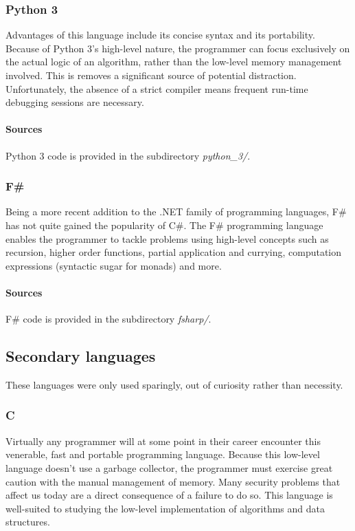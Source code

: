 \documentclass{article}
\begin{document}
\subsubsection{Python 3}
Advantages of this language include its concise syntax and its portability.
Because of Python 3's high-level nature, the programmer can focus exclusively on the actual logic of an algorithm,
rather than the low-level memory management involved. This is removes a significant source of potential distraction.
Unfortunately, the absence of a strict compiler means frequent run-time debugging sessions are necessary.

\paragraph{Sources}
Python 3 code is provided in the subdirectory {\em python\_3/}.

\subsubsection{F\#}
Being a more recent addition to the .NET family of programming languages,
F\# has not quite gained the popularity of C\#.
The F\# programming language enables the programmer to tackle problems
using high-level concepts such as recursion, higher order functions,
partial application and currying, computation expressions
(syntactic sugar for monads) and more.

\paragraph{Sources}
F\# code is provided in the subdirectory {\em fsharp/}.


\newpage


\subsection{Secondary languages}
These languages were only used sparingly, out of curiosity rather than necessity.

\subsubsection{C}
Virtually any programmer will at some point in their career encounter this venerable,
fast and portable programming language. Because this low-level language doesn't use a garbage collector,
the programmer must exercise great caution with the manual management of memory.
Many security problems that affect us today are a direct consequence of a failure to do so.
This language is well-suited to studying the low-level implementation of algorithms and data structures.
\end{document}
